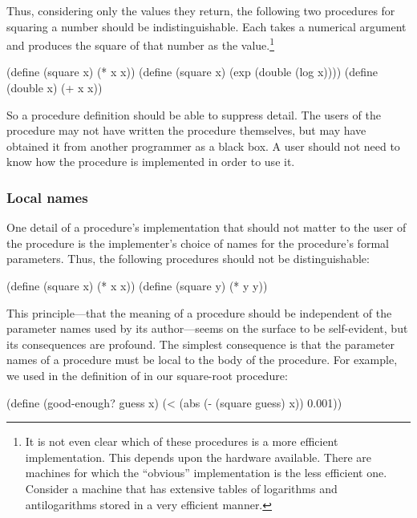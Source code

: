 Thus, considering only the values they return, the following two procedures for
squaring a number should be indistinguishable.  Each takes a numerical argument
and produces the square of that number as the value.\footnote{It is not even
clear which of these procedures is a more efficient implementation.  This
depends upon the hardware available.  There are machines for which the
``obvious'' implementation is the less efficient one.  Consider a machine that
has extensive tables of logarithms and antilogarithms stored in a very
efficient manner.}

\begin{codeBlock}
(define (square x) (* x x))
(define (square x) (exp (double (log x))))
(define (double x) (+ x x))
\end{codeBlock}

\noindent
So a procedure definition should be able to suppress detail.  The users of the
procedure may not have written the procedure themselves, but may have obtained
it from another programmer as a black box.  A user should not need to know how
the procedure is implemented in order to use it.

\subsubsection*{Local names}

One detail of a procedure's implementation that should not matter to the user
of the procedure is the implementer's choice of names for the procedure's
formal parameters.  Thus, the following procedures should not be
distinguishable:

\begin{codeBlock}
(define (square x) (* x x))
(define (square y) (* y y))
\end{codeBlock}

\noindent
This principle---that the meaning of a procedure should be independent of the
parameter names used by its author---seems on the surface to be self-evident,
but its consequences are profound.  The simplest consequence is that the
parameter names of a procedure must be local to the body of the procedure.  For
example, we used  in the definition of  in our
square-root procedure:

\begin{codeBlock}
(define (good-enough? guess x)
  (< (abs (- (square guess) x))
     0.001))
\end{codeBlock}

